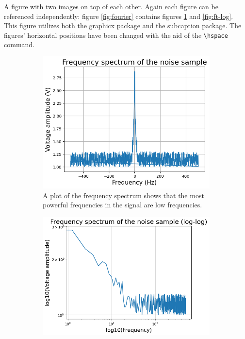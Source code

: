 \documentclass{article}
\begin{document}
    \pagebreak

    A figure with two images on top of each other. Again each figure can be referenced independently: figure \ref{fig:fourier} contains figures \ref{fig:ft} and \ref{fig:ft-log}.
    This figure utilizes both the graphicx package and the subcaption package. The figures' horizontal positions have been changed with the aid of the \texttt{\textbackslash hspace} command.

    \begin{figure}[h!]
        \centering
        \caption{Using the discrete Fourier transform, the frequency spectrum of the noise signal was revealed.}
        \label{fig:fourier}
        \hspace{40pt}\begin{subfigure}{0.6\textwidth}
            \includegraphics[width=\textwidth]{fourier/fourier.png}
            \caption{A plot of the frequency spectrum shows that the most powerful frequencies in the signal are low frequencies.}
            \label{fig:ft}
        \end{subfigure}
        \newline
        \begin{subfigure}{0.6\textwidth}
            \includegraphics[width=\textwidth]{fourier/fourier-log.png}

\end{subfigure}
\end{figure}
\end{document}
